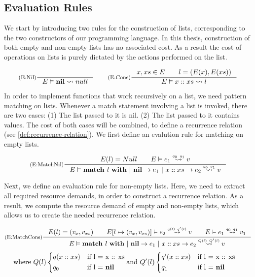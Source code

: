 \subsection{Evaluation Rules}

We start by introducing two rules for the construction of lists, corresponding to the two constructors of our programming language. In this thesis, construction of both empty and non-empty lists has no associated cost. As a result the cost of operations on lists is purely dictated by the actions performed on the list. 

\[
   \inference[(E:Nil)]
   {}
   {\evals{E}{\listnil}{null}{}{}}
   \qquad
   \inference[(E:Cons)]
   {\contains{E}{x, xs} \qquad l = (E(x), E(xs))}
   {\evals{E}{\cons{x}{xs}}{l}{}{}}
\]

In order to implement functions that work recursively on a list, we need pattern matching on lists. Whenever a match statement involving a list is invoked, there are two cases: (1) The list passed to it is nil. (2) The list passed to it contains values. The cost of both cases will be combined, to define a recurrence relation (see \cref{def:recurrence-relation}). We first define an evalution rule for matching on empty lists.

\[
   \inference[(E:MatchNil)]
   {E(l) = Null \qquad \evals{E}{e_1}{v}{q_0}{q_1}}
   {\evals{E}{\listmatch{l}{e_1}{e_2}}{v}{q_0}{q_1}}
\]

Next, we define an evaluation rule for non-empty lists. Here, we need to extract all required resource demands, in order to construct a recurrence relation. As a result, we compute the resource demand of empty and non-empty lists, which allows us to create the needed recurrence relation.

\[
   \inference[(E:MatchCons)]
   {E(l) = (v_x, v_{xs}) \qquad \evals{\envaugment{E}{l}{(v_x, v_{xs})}}{e_2}{v}{q(l)}{q'(l)} \qquad \evals{E}{e_1}{v_1}{q_0}{q_1}}
   {\evals{E}{\listmatch{l}{e_1}{e_2}}{v}{Q(l)}{Q'(l)}}
\]
\[
   \begin{aligned}
      \text{where }  & Q(l) \begin{cases*}
         q(x :: xs)     & if l = x :: xs\\
         q_0            & if l = \listnil
         \end{cases*} \text{and } Q'(l) \begin{cases*}
         q'(x :: xs)     & if l = x :: xs\\
         q_1            & if l = \listnil
      \end{cases*}
   \end{aligned}
\]


